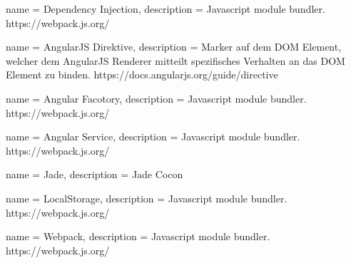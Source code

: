 {
  name = Dependency Injection,
  description = { Javascript module bundler.  https://webpack.js.org/ }
}

{
  name = AngularJS Direktive,
  description = { Marker auf dem DOM Element, welcher dem AngularJS Renderer mitteilt spezifisches Verhalten an das DOM Element zu binden. https://docs.angularjs.org/guide/directive }
}


{
  name = Angular Facotory,
  description = { Javascript module bundler.  https://webpack.js.org/ }
}


{
  name = Angular Service,
  description = { Javascript module bundler.  https://webpack.js.org/ }
}

{
  name = Jade,
  description = { Jade Cocon}
}

{
  name = LocalStorage,
  description = { Javascript module bundler.  https://webpack.js.org/ }
}


{
  name = Webpack,
  description = { Javascript module bundler.  https://webpack.js.org/ }
}
